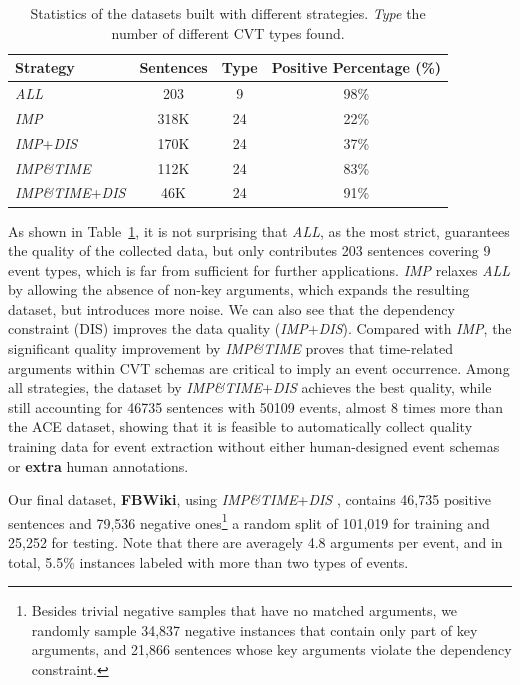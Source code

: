 \begin{table}[t!]
\scriptsize
\centering
\begin{tabular}{|l|c|c|c|} \hline
	 Strategy & Sentences & Type & Positive Percentage (\%) \\ \hline
	 \emph{ALL} & 203 & 9 & 98\% \\ \hline
	 \emph{IMP} & 318K & 24 & 22\% \\ \hline
	 \emph{IMP}+\emph{DIS} & 170K & 24 & 37\% \\ \hline
	 \emph{IMP\&TIME} & 112K & 24 & 83\% \\ \hline
	 \emph{IMP\&TIME}+\emph{DIS} & 46K & 24 & 91\% \\ \hline
\end{tabular}
\caption{Statistics of the datasets built with different strategies.
\textit{Type} the number of different CVT types found.  
\label{tab:3}}
\end{table}

As shown in Table~\ref{tab:3}, it is not surprising that \emph{ALL}, as the most strict, guarantees the quality of the collected data, but only contributes 203 sentences covering 9 event types, which is far from sufficient for further applications. \emph{IMP} relaxes \emph{ALL} by allowing the absence of non-key arguments, which expands the resulting dataset, but introduces more noise.
We can also see that the dependency constraint (DIS) improves the data quality (\emph{IMP}+\emph{DIS}).
Compared with \emph{IMP}, the significant quality improvement by \emph{IMP\&TIME} proves that time-related arguments within CVT schemas are critical to imply an event occurrence. Among all strategies, the dataset by \emph{IMP\&TIME}+\emph{DIS}  achieves the best quality, while still accounting for 46735 sentences with 50109 events, almost 8 times more than the ACE dataset, showing that it is feasible to automatically collect quality training data for event extraction without either human-designed event schemas or \textbf{extra} human annotations.

Our final dataset, \textbf{FBWiki}, using \emph{IMP\&TIME}+\emph{DIS} , contains 46,735 positive sentences and 79,536 negative ones\footnote{Besides trivial negative samples that have no matched arguments, we randomly sample 34,837 negative instances that contain only part of key arguments, and 21,866 sentences whose key arguments violate the dependency constraint.}
 a random split of 101,019 for
training and 25,252 for testing. Note that there are averagely 4.8 arguments per event, and in total, 5.5\% instances labeled with more
than two types of events.

